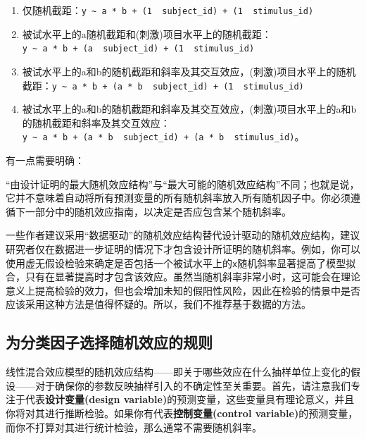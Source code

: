 \documentclass[
]{book}
\providecommand{\tightlist}{%
  \setlength{\itemsep}{0pt}\setlength{\parskip}{0pt}}
\begin{document}
\begin{enumerate}
\def\labelenumi{\arabic{enumi}.}
\tightlist
\item
  仅随机截距：\texttt{y\ \textasciitilde{}\ a\ *\ b\ +\ (1\ \textbar{}\ subject\_id)\ +\ (1\ \textbar{}\ stimulus\_id)}
\item
  被试水平上的a随机截距和(刺激)项目水平上的随机截距：\texttt{y\ \textasciitilde{}\ a\ *\ b\ +\ (a\ \textbar{}\ subject\_id)\ +\ (1\ \textbar{}\ stimulus\_id)}
\item
  被试水平上的a和b的随机截距和斜率及其交互效应，(刺激)项目水平上的随机截距：\texttt{y\ \textasciitilde{}\ a\ *\ b\ +\ (a\ *\ b\ \textbar{}\ subject\_id)\ +\ (1\ \textbar{}\ stimulus\_id)}
\item
  被试水平上的a和b的随机截距和斜率及其交互效应，(刺激)项目水平上的a和b的随机截距和斜率及其交互效应：\texttt{y\ \textasciitilde{}\ a\ *\ b\ +\ (a\ *\ b\ \textbar{}\ subject\_id)\ +\ (a\ *\ b\ \textbar{}\ stimulus\_id)}。
\end{enumerate}

有一点需要明确：

``由设计证明的最大随机效应结构''与``最大可能的随机效应结构''不同；也就是说，它并不意味着自动将所有预测变量的所有随机斜率放入所有随机因子中。你必须遵循下一部分中的随机效应指南，以决定是否应包含某个随机斜率。

一些作者建议采用``数据驱动''的随机效应结构替代设计驱动的随机效应结构，建议研究者仅在数据进一步证明的情况下才包含设计所证明的随机斜率\citep{Matuschek_et_al_2017}。例如，你可以使用虚无假设检验来确定是否包括一个被试水平上的\texttt{x}随机斜率显著提高了模型拟合，只有在显著提高时才包含该效应。虽然当随机斜率非常小时，这可能会在理论意义上提高检验的效力，但也会增加未知的假阳性风险，因此在检验的情景中是否应该采用这种方法是值得怀疑的。所以，我们不推荐基于数据的方法。

\hypertarget{ux4e3aux5206ux7c7bux56e0ux5b50ux9009ux62e9ux968fux673aux6548ux5e94ux7684ux89c4ux5219}{%
\subsection{为分类因子选择随机效应的规则}\label{ux4e3aux5206ux7c7bux56e0ux5b50ux9009ux62e9ux968fux673aux6548ux5e94ux7684ux89c4ux5219}}

线性混合效应模型的随机效应结构------即关于哪些效应在什么抽样单位上变化的假设------对于确保你的参数反映抽样引入的不确定性至关重要\citep{Barr_et_al_2013}。首先，请注意我们专注于代表\textbf{设计变量(design variable)}的预测变量，这些变量具有理论意义，并且你将对其进行推断检验。如果你有代表\textbf{控制变量(control variable)}的预测变量，而你不打算对其进行统计检验，那么通常不需要随机斜率。
\end{document}
